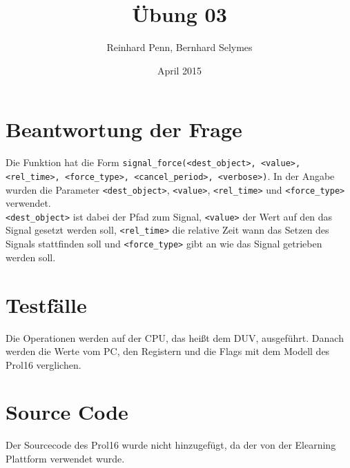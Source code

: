 \documentclass[12pt,a4paper]{article}
\begin{document}
\title{Übung 03}
\author{Reinhard Penn, Bernhard Selymes}
\date{April 2015}

\normalsize


\newcommand{\Uebung}{BFMSV}
\newcommand{\srcpath}{../../src}
\newcommand{\simpath}{../../sim}



\section{Beantwortung der Frage}
Die Funktion hat die Form \texttt{\textdollar signal\_force(<dest\_object>, <value>, <rel\_time>, <force\_type>, <cancel\_period>, <verbose>)}. In der Angabe wurden die Parameter \texttt{<dest\_object>}, \texttt{<value>}, \texttt{<rel\_time>} und \texttt{<force\_type>} verwendet. \\
\texttt{<dest\_object>} ist dabei der Pfad zum Signal, \texttt{<value>} der Wert auf den das Signal gesetzt werden soll, \texttt{<rel\_time>} die relative Zeit wann das Setzen des Signals stattfinden soll und \texttt{<force\_type>} gibt an wie das Signal getrieben werden soll.

\section{Testfälle}
Die Operationen werden auf der CPU, das heißt dem DUV, ausgeführt. Danach werden die Werte vom PC, den Registern und die Flags mit dem Modell des Prol16 verglichen.

\section{Source Code}

Der Sourcecode des Prol16 wurde nicht hinzugefügt, da der von der Elearning Plattform verwendet wurde.












\end{document}

